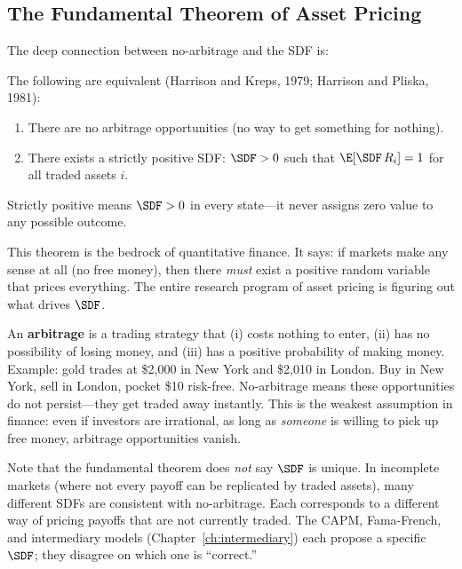 \subsection{The Fundamental Theorem of Asset Pricing}

The deep connection between no-arbitrage and the SDF is:

\begin{keyidea}
The following are equivalent (Harrison and Kreps, 1979; Harrison and Pliska, 1981):
\begin{enumerate}[nosep]
  \item There are no arbitrage opportunities (no way to get something for nothing).
  \item There exists a strictly positive SDF: $\SDF > 0$ such that $\E[\SDF \, R_i] = 1$ for all traded assets $i$.
\end{enumerate}
Strictly positive means $\SDF > 0$ in every state---it never assigns zero value to any possible outcome.
\end{keyidea}

This theorem is the bedrock of quantitative finance. It says: if markets make any sense at all (no free money), then there \emph{must} exist a positive random variable that prices everything. The entire research program of asset pricing is figuring out what drives $\SDF$.

\begin{prereq}[No-Arbitrage]
An \textbf{arbitrage} is a trading strategy that (i) costs nothing to enter, (ii) has no possibility of losing money, and (iii) has a positive probability of making money. Example: gold trades at \$2{,}000 in New York and \$2{,}010 in London. Buy in New York, sell in London, pocket \$10 risk-free. No-arbitrage means these opportunities do not persist---they get traded away instantly. This is the weakest assumption in finance: even if investors are irrational, as long as \emph{someone} is willing to pick up free money, arbitrage opportunities vanish.
\end{prereq}

Note that the fundamental theorem does \emph{not} say $\SDF$ is unique. In incomplete markets (where not every payoff can be replicated by traded assets), many different SDFs are consistent with no-arbitrage. Each corresponds to a different way of pricing payoffs that are not currently traded. The CAPM, Fama-French, and intermediary models (Chapter~\ref{ch:intermediary}) each propose a specific $\SDF$; they disagree on which one is ``correct.''

